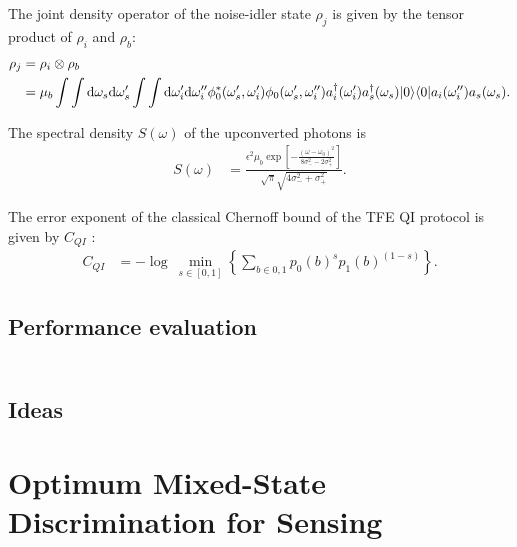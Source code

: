 \documentclass[../../note.tex]{subfiles}
\begin{document}
\begin{lemma}
    The joint density operator of the noise-idler state $\rho_j$ is given by the tensor product of $\rho_i$ and $\rho_b$:
    \begin{align}
        \rho_j 
        &= \rho_i \otimes \rho_b \\
        &= \mu_b \int \int {\rm d}\omega_s{\rm d}\omega_s' \int \int {\rm d}\omega_i'{\rm d}\omega_i''\phi_0^\ast(\omega_s', \omega_i') \phi_0(\omega_s', \omega_i'') a_i^\dagger(\omega_i') a_s^\dagger(\omega_s)\vert 0 \rangle \langle 0 \vert a_i(\omega_i'')a_s(\omega_s).
    \end{align}
\end{lemma}

\begin{lemma}
    The spectral density $S(\omega)$ of the upconverted photons is
    \begin{align}
        S(\omega)
        &= \frac{\epsilon^2 \mu_b \exp\left[-\frac{(\omega - \omega_0)^2}{8 \sigma_-^2 - 2 \sigma_+^2}\right]}{\sqrt{\pi} \sqrt{4 \sigma_-^2 + \sigma_+^2}}.
    \end{align}
\end{lemma}

\begin{theorem}
    The error exponent of the classical Chernoff bound of the TFE QI protocol is given by $C_{QI}$ \cite{nussbaum2009chernoff}:
    \begin{align}
        C_{QI}
        &= -\log~\min_{s \in [0,1]} \left\{\sum_{b \in 0,1}p_0(b)^s p_1(b)^{(1-s)}\right\}.
    \end{align}
\end{theorem}

\subsection{Performance evaluation}

\begin{lemma}
    \begin{align}
    \end{align}
\end{lemma}

\subsection{Ideas}

\section{Optimum Mixed-State Discrimination for Sensing \cite{zhuang2017optimum}}
\end{document}
